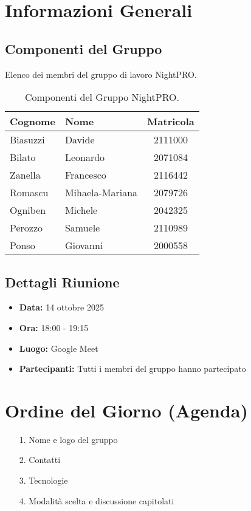 \documentclass[a4paper, 11pt, oneside]{scrartcl} %
\begin{document}
\section{Informazioni Generali}

\subsection{Componenti del Gruppo}
Elenco dei membri del gruppo di lavoro NightPRO.

\begin{table}[h!]
\centering
\begin{tabular}{@{}llc@{}}
\toprule
\textbf{Cognome} & \textbf{Nome} & \textbf{Matricola} \\
\midrule
Biasuzzi & Davide & 2111000 \\
Bilato & Leonardo & 2071084 \\
Zanella & Francesco & 2116442 \\
Romascu & Mihaela-Mariana & 2079726 \\
Ogniben & Michele & 2042325 \\
Perozzo & Samuele & 2110989 \\
Ponso & Giovanni & 2000558 \\
\bottomrule
\end{tabular}
\caption{Componenti del Gruppo NightPRO.}
\end{table}

\subsection{Dettagli Riunione}
\begin{itemize}
    \item \textbf{Data:} 14 ottobre 2025
    \item \textbf{Ora:} 18:00 - 19:15
    \item \textbf{Luogo:} Google Meet
    \item \textbf{Partecipanti:} Tutti i membri del gruppo hanno partecipato
\end{itemize}


\newpage
\section{Ordine del Giorno (Agenda)}
\begin{itemize}
    \item[1.] Nome e logo del gruppo
    \item[2.] Contatti
    \item[3.] Tecnologie
    \item[4.] Modalità scelta e discussione capitolati
\end{itemize}
\end{document}
